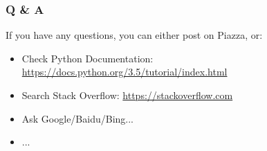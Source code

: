 \documentclass[xcolor={usenames, dvipsnames}, hyperref={colorlinks,linkcolor=black, urlcolor=blue}]{beamer}
\begin{document}

\begin{frame}
\frametitle{Q \& A}

If you have any questions, you can either post on Piazza, or:

\begin{itemize}
\item Check Python Documentation: \url{https://docs.python.org/3.5/tutorial/index.html}
\item Search Stack Overflow: \url{https://stackoverflow.com}
\item Ask Google/Baidu/Bing...
\item ...
\end{itemize}
\end{frame}

\end{document}
